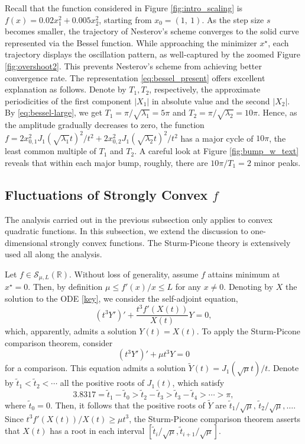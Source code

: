 \documentclass[twoside,11pt]{article}
\newcommand{\R}{\mathbb{R}}
\def\N{Nesterov's scheme }
\begin{document}
Recall that the function considered in Figure \ref{fig:intro_scaling} is $f(x) = 0.02x_1^2 + 0.005x_2^2$, starting from $x_0 = (1, ~1)$. As the step size $s$ becomes smaller, the trajectory of \N converges to the solid curve represented via the Bessel function. While approaching the minimizer $x^\star$, each trajectory displays the oscillation pattern, as well-captured by the zoomed Figure \ref{fig:overshoot2}. This prevents Nesterov's scheme from achieving better convergence rate. The representation \eqref{eq:bessel_present} offers excellent explanation as follows. Denote by $T_1, T_2$, respectively, the approximate periodicities of the first component $|X_1|$ in absolute value and the second $|X_2|$. By \eqref{eq:bessel-large}, we get $T_1 = \pi/\sqrt{\lambda_1} = 5\pi$ and $T_2 = \pi/\sqrt{\lambda_2} = 10\pi$. Hence, as the amplitude gradually decreases to zero, the function $f = 2x_{0,1}^2J_1(\sqrt{\lambda_1}t)^2/t^2 + 2x_{0,2}^2J_1(\sqrt{\lambda_2}t)^2/t^2$ has a major cycle of $10\pi$, the least common multiple of $T_1$ and $T_2$. A careful look at Figure \ref{fig:bump_w_text} reveals that within each major bump, roughly, there are $10\pi/T_1 = 2 $ minor peaks. 

\subsection{Fluctuations of Strongly Convex $f$}
\label{sec:fluc}
The analysis carried out in the previous subsection only applies to convex quadratic functions. In this subsection, we extend the discussion to one-dimensional strongly convex functions. The Sturm-Picone theory \citep[see e.g.][]{sturm} is extensively used all along the analysis.

Let $f \in \mathcal{S}_{\mu,L}(\R)$. Without loss of generality, assume $f$ attains minimum at $x^\star = 0$. Then, by definition $\mu \le f'(x)/x \le L $ for any $x \ne 0$. Denoting by $X$ the solution to the ODE \eqref{key}, we consider the self-adjoint equation,
\begin{equation}\label{eq:adjoint}
(t^3Y')' + \frac{t^3f'(X(t))}{X(t)}Y = 0,
\end{equation}
which, apparently, admits a solution $Y(t) = X(t)$. To apply the Sturm-Picone comparison theorem, consider
\begin{equation}\nonumber
(t^3Y')' + \mu t^3Y = 0
\end{equation}
for a comparison. This equation admits a solution $\widetilde Y(t) = J_1(\sqrt{\mu}t)/t$. Denote by $\tilde t_1 < \tilde t_2 < \cdots$ all the positive roots of $J_1(t)$, which satisfy \citep[see e .g.][]{besselbook}
\begin{equation}\nonumber
3.8317 = \tilde t_1 - \tilde t_0 > \tilde t_2 - \tilde t_3 > \tilde t_3 - \tilde t_4 > \cdots > \pi,
\end{equation}
where $\tilde t_0 = 0$. Then, it follows that the positive roots of $\widetilde Y$ are $\tilde t_1/\sqrt{\mu},\, \tilde t_2/\sqrt{\mu}, \ldots$. Since $t^3f'(X(t))/X(t) \geq \mu t^3$, the Sturm-Picone comparison theorem asserts that $X(t)$ has a root in each interval $[\tilde t_i/\sqrt{\mu}, \tilde t_{i+1}/\sqrt{\mu}]$. 
\end{document}
